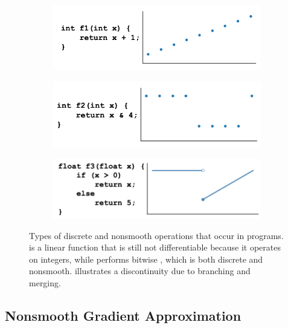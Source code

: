 \begin{figure}[t]
  \centering
  \begin{subfigure}[b]{0.32\textwidth}
    \includegraphics[width=\textwidth]{figs/f1}
  \end{subfigure}
  \begin{subfigure}[b]{0.32\linewidth}
    \includegraphics[width=\linewidth]{figs/f2}
  \end{subfigure}
  \begin{subfigure}[b]{0.32\linewidth}
    \includegraphics[width=\linewidth]{figs/f3}
  \end{subfigure}
  \vspace{-10pt}
   \caption{ Types of discrete and nonsmooth operations that occur in programs.  is a linear function that is still not differentiable because it operates on integers, while  performs bitwise , which is both discrete and nonsmooth.  illustrates a discontinuity due to branching and merging.}
  \label{fig:ex_funcs}
  \vspace{-10pt}
\end{figure}

\subsection{Nonsmooth Gradient Approximation}

